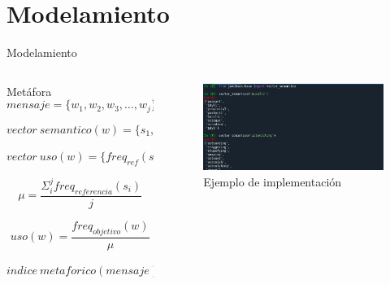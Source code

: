\documentclass[presentation]{beamer}
\begin{document}
\section{Modelamiento}
\label{sec:org923380a}
\begin{frame}[label={sec:org7a6c766}]{Modelamiento}
\begin{columns}
\begin{column}{0.48\columnwidth}
\tiny
    \begin{block}{Metáfora}
\begin{equation}
\label{eq:mensaje}
mensaje = \{ w_1, w_2, w_3, \dots , w_j \}
\end{equation}

\begin{equation}
\label{eq:vector_semantico}
vector\ semantico(w) = \{s_1, s_2, s_3, \dots, s_j \} 
\end{equation}

\begin{equation}
\label{eq:vector_uso}
vector\ uso(w) = \{freq_{ref}(s_1),freq_{ref}(s_2),freq_{ref}(s_3), \dots, freq_{ref}(s_j) \} 
\end{equation}

\begin{equation}
\label{eq:promedio}
\mu = \frac{\Sigma_i^jfreq_{referencia}(s_i)}{j}
\end{equation}


\begin{equation}
\label{eq:uso}
uso(w) = \frac{freq_{objetivo}(w)}{\mu}
\end{equation}


\begin{equation}
\label{eq:indice_metafórico}
indice\ metaforico(mensaje) =  \Sigma_i^j uso(w_i)
\end{equation}

\end{block}
\normalsize
\end{column}
\begin{column}{0.48\columnwidth}
     \begin{figure}
\includegraphics[width=\textwidth]{./assets/codigo_vector_semantico.png}
\caption{Ejemplo de implementación}
\end{figure}


\end{column}
\end{columns}
\end{frame}
\end{document}
